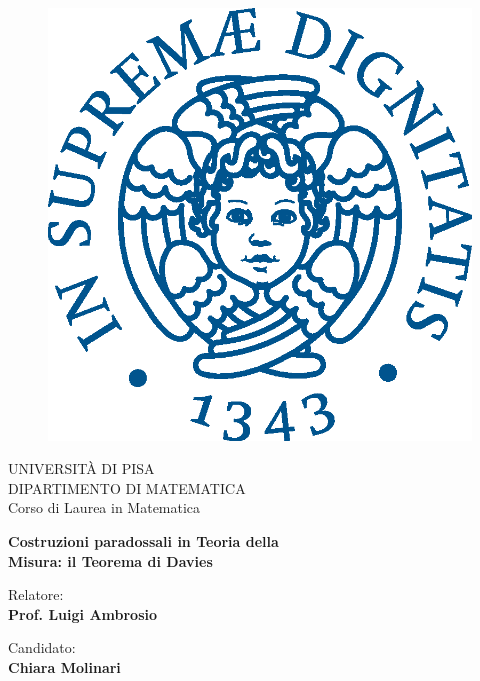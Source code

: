 \begin{titlepage}
\begin{figure}[!htb]
    \centering
    \includegraphics[keepaspectratio=true,scale=0.5]{cherubino_pant541.eps}
\end{figure}

\begin{center}
    \LARGE{UNIVERSITÀ DI PISA}
    \vspace{5mm}
    \\ \large{DIPARTIMENTO DI MATEMATICA}
    \vspace{5mm}
    \\ \LARGE{Corso di Laurea in Matematica}
\end{center}

\vspace{15mm}
\begin{center}
    {\LARGE{\bf Costruzioni paradossali in Teoria della\\\vspace{5mm}Misura: il Teorema di Davies}}
\end{center}
\vspace{30mm}

\begin{minipage}[t]{0.47\textwidth}
	{\large{Relatore:}{\normalsize\vspace{3mm}
	\bf\\ \large{Prof. Luigi Ambrosio}}}
\end{minipage}
\hfill
\begin{minipage}[t]{0.47\textwidth}\raggedleft
	{\large{Candidato:}{\normalsize\vspace{3mm} \bf\\ \large{Chiara Molinari\\ }}}
\end{minipage}

\vspace{30mm}
\hrulefill
\\

\end{titlepage}